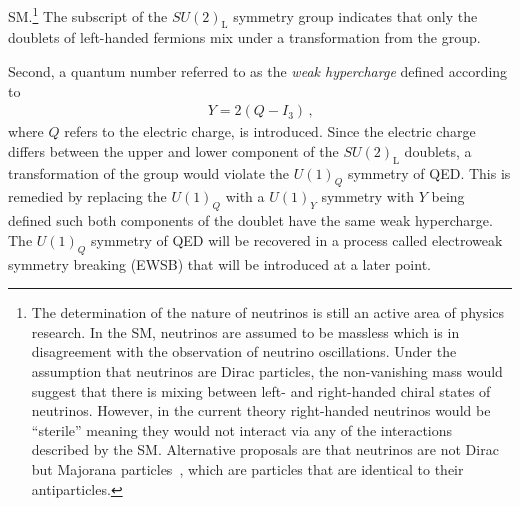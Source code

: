 SM.\footnote{The determination of the nature of neutrinos is still an active
  area of physics research. In the SM, neutrinos are assumed to be massless
  which is in disagreement with the observation of neutrino oscillations. Under
  the assumption that neutrinos are Dirac particles, the non-vanishing mass
  would suggest that there is mixing between left- and right-handed chiral
  states of neutrinos. However, in the current theory right-handed neutrinos
  would be ``sterile'' meaning they would not interact via any of the
  interactions described by the SM. Alternative proposals are that neutrinos are
  not Dirac but Majorana particles~\cite{Majorana:1937vz}, which are particles
  that are identical to their antiparticles.} The subscript of the
$SU(2)_{\text{L}}$ symmetry group indicates that only the doublets of
left-handed fermions mix under a transformation from the group.

Second, a quantum number referred to as the \emph{weak hypercharge} defined
according to
\begin{align*}
  Y = 2 (Q - I_3) \,\text{,}
\end{align*}
where $Q$ refers to the electric charge, is introduced. Since the electric
charge differs between the upper and lower component of the $SU(2)_{\text{L}}$
doublets, a transformation of the group would violate the $U(1)_Q$ symmetry of
QED. This is remedied by replacing the $U(1)_Q$ with a $U(1)_Y$ symmetry with
$Y$ being defined such both components of the doublet have the same weak
hypercharge. The $U(1)_Q$ symmetry of QED will be recovered in a process called
electroweak symmetry breaking (EWSB) that will be introduced at a later point.


